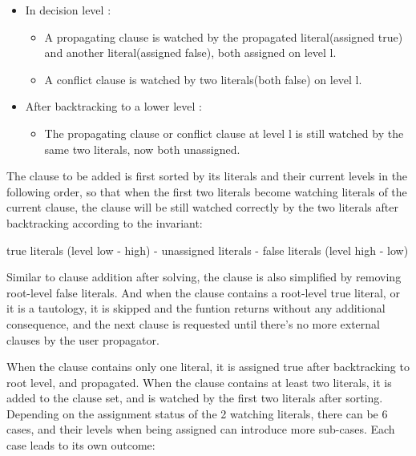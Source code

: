 \begin{itemize}
  \item In decision level :
  \begin{itemize}
    \item A propagating clause is watched by the propagated literal(assigned true) and another literal(assigned false), both assigned on level l.
    \item A conflict clause is watched by two literals(both false) on level l.
  \end{itemize}
  \item After backtracking to a lower level :
  \begin{itemize}
    \item The propagating clause or conflict clause at level l is still watched by the same two literals, now both unassigned.
  \end{itemize}
\end{itemize}

The clause to be added is first sorted by its literals and their current levels in the following order, so that when the first two literals become watching literals of the current clause, the clause will be still watched correctly by the two literals after backtracking according to the invariant:

true literals (level low - high) - unassigned literals - false literals (level high - low)

Similar to clause addition after solving, the clause is also simplified by removing root-level false literals. And when the clause contains a root-level true literal, or it is a tautology, it is skipped and the funtion returns without any additional consequence, and the next clause is requested until there's no more external clauses by the user propagator.

When the clause contains only one literal, it is assigned true after backtracking to root level, and propagated. When the clause contains at least two literals, it is added to the clause set, and is watched by the first two literals after sorting. Depending on the assignment status of the 2 watching literals, there can be 6 cases, and their levels when being assigned can introduce more sub-cases. Each case leads to its own outcome:

